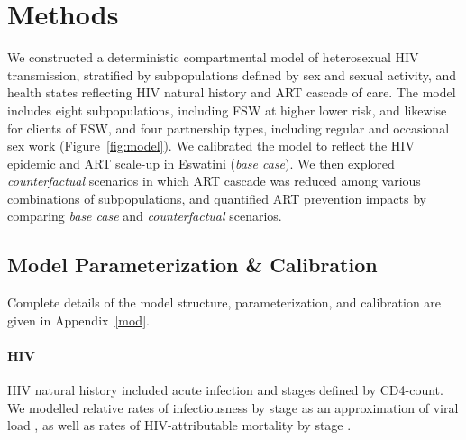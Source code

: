 \section{Methods}\label{art.meth}
We constructed a deterministic compartmental model of heterosexual HIV transmission, stratified by
subpopulations defined by sex and sexual activity, and
health states reflecting HIV natural history and ART cascade of care.
The model includes eight subpopulations,
including FSW at higher \vs lower risk, and likewise for clients of FSW,
and four partnership types, including regular and occasional sex work (Figure~\ref{fig:model}).
We calibrated the model to reflect the HIV epidemic and ART scale-up in Eswatini (\emph{base case}).
We then explored \emph{counterfactual} scenarios in which
ART cascade was reduced among various combinations of subpopulations,
and quantified ART prevention impacts by comparing \emph{base case} and \emph{counterfactual} scenarios.
\subsection{Model Parameterization \& Calibration}\label{art.meth.par}
Complete details of the model structure, parameterization, and calibration are given in Appendix~\ref{mod}.
\paragraph{HIV}
HIV natural history included acute infection and stages defined by CD4-count.
We modelled relative rates of infectiousness by stage
as an approximation of viral load \cite{Wawer2005,Boily2009,Donnell2010,Bellan2015},
as well as rates of HIV-attributable mortality by stage \cite{Badri2006,Anglaret2012,Mangal2017}.
